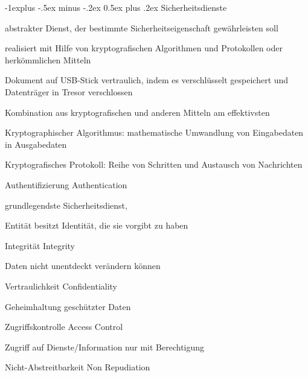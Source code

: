 \documentclass[a4paper]{article}
\makeatletter
\renewcommand{\subsection}{\@startsection{subsection}{2}{0mm}%
 {-1explus -.5ex minus -.2ex}%
 {0.5ex plus .2ex}%
 {\normalfont\normalsize\bfseries}}
\makeatother
\begin{document}
\begin{multicols}{3}
      \subsection{Sicherheitsdienste}
      \begin{itemize*}
            \item abstrakter Dienst, der bestimmte Sicherheitseigenschaft gewährleisten soll
            \item realisiert mit Hilfe von kryptografischen Algorithmen und Protokollen oder herkömmlichen Mitteln
            \item Dokument auf USB-Stick vertraulich, indem es verschlüsselt gespeichert und Datenträger in Tresor verschlossen
            \item Kombination aus kryptografischen und anderen Mitteln am effektivsten
            \item Kryptographischer Algorithmus: mathematische Umwandlung von Eingabedaten in Ausgabedaten
            \item Kryptografisches Protokoll: Reihe von Schritten und Austausch von Nachrichten %
      \end{itemize*}
      \begin{description*}
            \item[Authentifizierung] Authentication
            \begin{itemize*}
                  \item grundlegendste Sicherheitsdienst,
                  \item Entität besitzt Identität, die sie vorgibt zu haben
            \end{itemize*}
            \item[Integrität] Integrity
            \begin{itemize*}
                  \item Daten nicht unentdeckt verändern können
            \end{itemize*}
            \item[Vertraulichkeit] Confidentiality
            \begin{itemize*}
                  \item Geheimhaltung geschützter Daten
            \end{itemize*}
            \item[Zugriffskontrolle] Access Control
            \begin{itemize*}
                  \item Zugriff auf Dienste/Information nur mit Berechtigung %
            \end{itemize*}
            \item[Nicht-Abstreitbarkeit] Non Repudiation %
      \end{description*}


\end{multicols}
\end{document}
